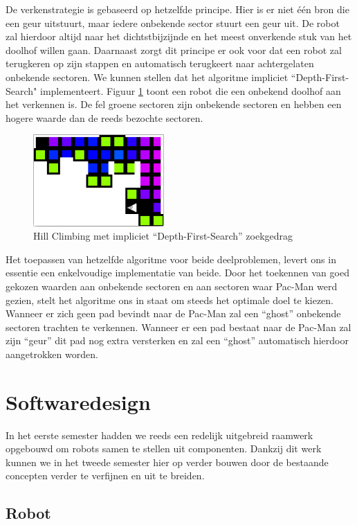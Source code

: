 \documentclass[12pt,a4paper]{report}
\begin{document}
De verkenstrategie is gebaseerd op hetzelfde principe. Hier is er niet \'e\'en bron die een geur uitstuurt, maar iedere onbekende sector stuurt een geur uit. De robot zal hierdoor altijd naar het dichtstbijzijnde en het meest onverkende stuk van het doolhof willen gaan. Daarnaast zorgt dit principe er ook voor dat een robot zal terugkeren op zijn stappen en automatisch terugkeert naar achtergelaten onbekende sectoren. We kunnen stellen dat het algoritme impliciet ``Depth-First-Search" implementeert. Figuur \ref{fig:dfs} toont een robot die een onbekend doolhof aan het verkennen is. De fel groene sectoren zijn onbekende sectoren en hebben een hogere waarde dan de reeds bezochte sectoren.

\begin{figure}[htbp]
  \centering
  \includegraphics[width=50mm]{resources/dfs.png}
  \caption{Hill Climbing met impliciet ``Depth-First-Search'' zoekgedrag}
  \label{fig:dfs}
\end{figure}

Het toepassen van hetzelfde algoritme voor beide deelproblemen, levert ons in essentie een enkelvoudige implementatie van beide. Door het toekennen van goed gekozen waarden aan onbekende sectoren en aan sectoren waar Pac-Man werd gezien, stelt het algoritme ons in staat om steeds het optimale doel te kiezen. Wanneer er zich geen pad bevindt naar de Pac-Man zal een ``ghost'' onbekende sectoren trachten te verkennen. Wanneer er een pad bestaat naar de Pac-Man zal zijn ``geur'' dit pad nog extra versterken en zal een ``ghost'' automatisch hierdoor aangetrokken worden.

\chapter{Softwaredesign}

In het eerste semester hadden we reeds een redelijk uitgebreid raamwerk opgebouwd om robots samen te stellen uit componenten. Dankzij dit werk kunnen we in het tweede semester hier op verder bouwen door de bestaande concepten verder te verfijnen en uit te breiden.

\section{Robot}
\end{document}
